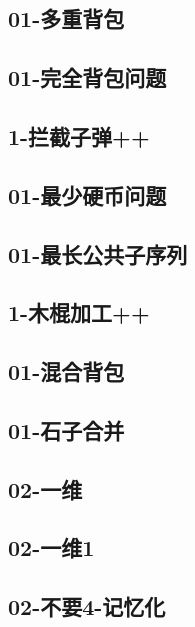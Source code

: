 \documentclass[10pt,a4paper]{article}
\begin{document}
\subsection{01-多重背包}

\subsection{01-完全背包问题}

\subsection{1-拦截子弹++}

\subsection{01-最少硬币问题}

\subsection{01-最长公共子序列}

\subsection{1-木棍加工++}

\subsection{01-混合背包}

\subsection{01-石子合并}

\subsection{02-一维}

\subsection{02-一维1}

\subsection{02-不要4-记忆化}

\end{document}
